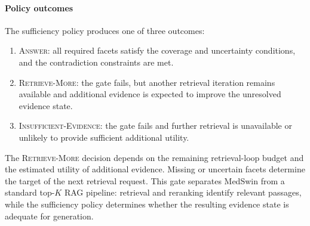 \documentclass[conference]{IEEEtran}
\begin{document}
\paragraph{Policy outcomes}
The sufficiency policy produces one of three outcomes:

\begin{enumerate}
    \item \textsc{Answer}: all required facets satisfy the coverage and uncertainty conditions, and the contradiction constraints are met.

    \item \textsc{Retrieve-More}: the gate fails, but another retrieval iteration remains available and additional evidence is expected to improve the unresolved evidence state.

    \item \textsc{Insufficient-Evidence}: the gate fails and further retrieval is unavailable or unlikely to provide sufficient additional utility.
\end{enumerate}

The \textsc{Retrieve-More} decision depends on the remaining retrieval-loop budget and the estimated utility of additional evidence. Missing or uncertain facets determine the target of the next retrieval request. This gate separates MedSwin from a standard top-\(K\) RAG pipeline: retrieval and reranking identify relevant passages, while the sufficiency policy determines whether the resulting evidence state is adequate for generation.



\end{document}
